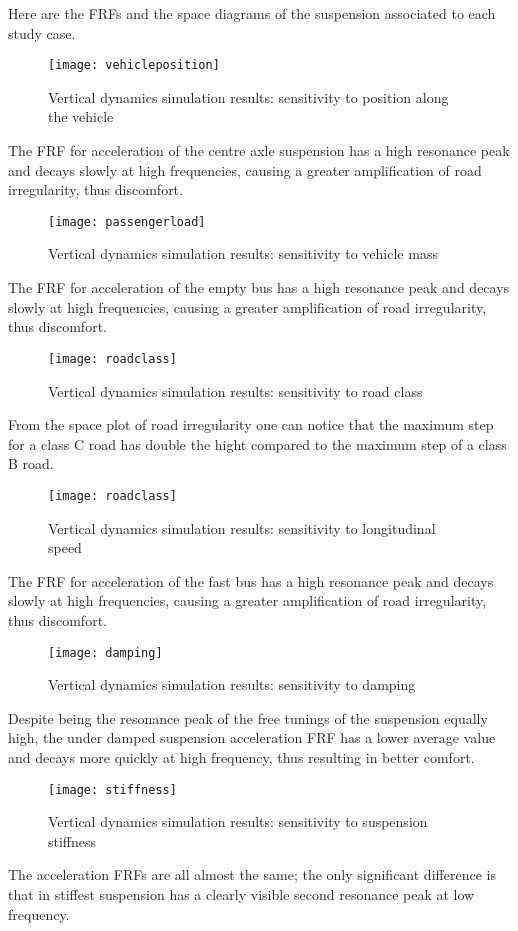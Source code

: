 \documentclass{article}
\begin{document}
Here are the FRFs and the space diagrams of the suspension associated to each study case. 
\begin{figure}[H]
\centering
\texttt{[image: vehicleposition]}
\caption{Vertical dynamics simulation results: sensitivity to position along the vehicle}
\end{figure}
The FRF for acceleration of the centre axle suspension has a high resonance peak and decays slowly at high frequencies, causing a greater amplification of road irregularity, thus discomfort. 
\begin{figure}[H]
\centering
\texttt{[image: passengerload]}
\caption{Vertical dynamics simulation results: sensitivity to vehicle mass}
\end{figure}
The FRF for acceleration of the empty bus has a high resonance peak and decays slowly at high frequencies, causing a greater amplification of road irregularity, thus discomfort. 
\begin{figure}[H]
\centering
\texttt{[image: roadclass]}
\caption{Vertical dynamics simulation results: sensitivity to road class}
\end{figure}
From the space plot of road irregularity one can notice that the maximum step for a class C road has double the hight compared to the maximum step of a class B road.
\begin{figure}[H]
\centering
\texttt{[image: roadclass]}
\caption{Vertical dynamics simulation results: sensitivity to longitudinal speed}
\end{figure}
The FRF for acceleration of the fast bus has a high resonance peak and decays slowly at high frequencies, causing a greater amplification of road irregularity, thus discomfort. 
\begin{figure}[H]
\centering
\texttt{[image: damping]}
\caption{Vertical dynamics simulation results: sensitivity to damping}
\end{figure}
Despite being the resonance peak of the free tunings of the suspension equally high, the under damped suspension acceleration FRF has a lower average value and decays more quickly at high frequency, thus resulting in better comfort. 
\begin{figure}[H]
\centering
\texttt{[image: stiffness]}
\caption{Vertical dynamics simulation results: sensitivity to suspension stiffness}
\end{figure}
The acceleration FRFs are all almost the same; the only significant difference is that in stiffest suspension has a clearly visible second resonance peak at low frequency. 
\newpage
\end{document}
